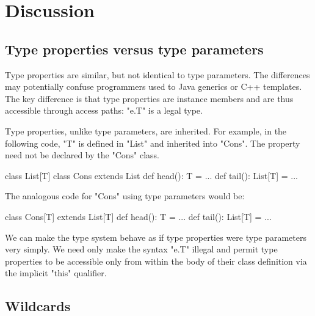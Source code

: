 \documentclass[preprint,nocopyrightspace,9pt]{sigplanconf}
\begin{document}
\section{Discussion}

\subsection{Type properties versus type parameters}

Type properties are similar, but not identical to type parameters.  The
differences may potentially confuse programmers used to Java generics or C++
templates.  The key difference is that type properties are instance members and
are thus accessible through access paths: \xcd"e.T" is a legal type.

Type properties, unlike type parameters, are inherited.
For example, in the following code, \xcd"T" is defined in \xcd"List"
and inherited into \xcd"Cons".  The property need not be
declared by the \xcd"Cons" class.
\begin{xten}
class List[T] { }
class Cons extends List {
    def head(): T = { ... }
    def tail(): List[T] = { ... }
}
\end{xten}
The analogous code for \xcd"Cons" using type parameters would be:
\begin{xten}
class Cons[T] extends List[T] {
    def head(): T = { ... }
    def tail(): List[T] = { ... }
}
\end{xten}

We can make the type system behave as if type properties were
type parameters very simply.  We need only make the syntax \xcd"e.T"
illegal and permit type properties to be accessible only
from within the body of their class definition via the implicit \xcd"this"
qualifier.

\subsection{Wildcards}
\end{document}
